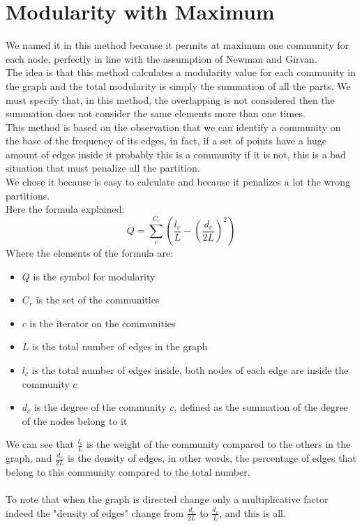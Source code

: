 \section{Modularity with Maximum}
We named it in this method because it permits at maximum one community for each node, perfectly in line with the assumption of Newman and Girvan.\\
The idea is that this method calculates a modularity value for each community in the graph and the total modularity is simply the summation of all the parts. We must specify that, in this method, the overlapping is not considered then the summation does not consider the same elements more than one times.\\
This method is based on the observation that we can identify a community on the base of the frequency of its edges, in fact, if a set of points have a huge amount of edges inside it probably this is a community if it is not, this is a bad situation that must penalize all the partition.\\
We chose it because is easy to calculate and because it penalizes a lot the wrong partitions.\\
Here the formula explained:
\begin{equation}
	Q=\sum_{c}^{C_r} \left( \frac{l_c}{L}-\left(\frac{d_c}{2L} \right)^2 \right)
	\label{eq:m_max}
\end{equation}
Where the elements of the formula are:
\begin{itemize}
	\item $Q$ is the symbol for modularity
	\item $C_r$ is the set of the communities
	\item $c$ is the iterator on the communities
	\item $L$ is the total number of edges in the graph
	\item $l_c$ is the total number of edges inside, both nodes of each edge are inside the community $c$
	\item $d_c$ is the degree of the community $c$, defined as the summation of the degree of the nodes belong to it
\end{itemize}
We can see that $\displaystyle\frac{l_c}{L}$ is the weight of the community compared to the others in the graph, and $\displaystyle\frac{d_c}{2L}$ is the density of edges, in other words, the percentage of edges that belong to this community compared to the total number.\\
\\
To note that when the graph is directed change only a multiplicative factor indeed the "density of edges" change from $\displaystyle\frac{d_c}{2L}$ to $\displaystyle\frac{d_c}{L}$, and this is all.
%
%
